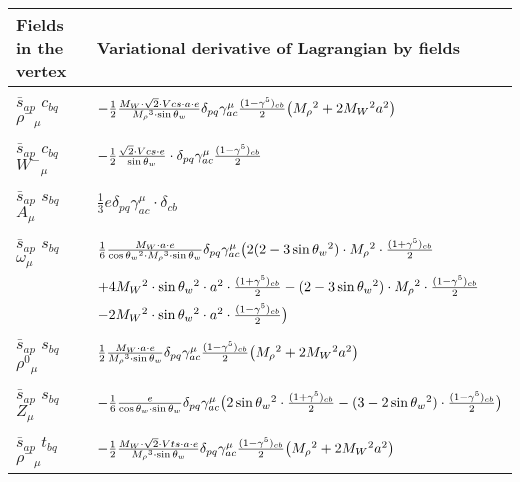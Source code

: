 \begin{center}
\begin{tabular}{|l|l|} \hline
Fields in the vertex & Variational derivative of Lagrangian by fields \\ \hline
$\bar{s}{}_{a p }$ \phantom{-} $c{}_{b q }$ \phantom{-} $\rho^-{}_{\mu }$ \phantom{-}  &
	$-\frac{1}{2}\frac{ M_W \cdot\sqrt{2} \cdot Vcs \cdot a \cdot e}{ M_\rho{}^3  \cdot \sin{\theta}_w}\delta_{p q} \gamma_{a c}^\mu {(1-\gamma^5)_{c b}\over 2} \big( M_\rho{}^2 +2 M_W{}^2  a{}^2 \big)$\\[2mm]
$\bar{s}{}_{a p }$ \phantom{-} $c{}_{b q }$ \phantom{-} $W^-{}_{\mu }$ \phantom{-}  &
	$-\frac{1}{2}\frac{\sqrt{2} \cdot Vcs \cdot e}{ \sin{\theta}_w}\cdot \delta_{p q} \gamma_{a c}^\mu {(1-\gamma^5)_{c b}\over 2} $\\[2mm]
$\bar{s}{}_{a p }$ \phantom{-} $s{}_{b q }$ \phantom{-} ${A}_{\mu }$ \phantom{-}  &
	$\frac{1}{3} e\delta_{p q} \gamma_{a c}^\mu \cdot \delta_{c b} $\\[2mm]
$\bar{s}{}_{a p }$ \phantom{-} $s{}_{b q }$ \phantom{-} $\omega{}_{\mu }$ \phantom{-}  &
	$\frac{1}{6}\frac{ M_W \cdot a \cdot e}{ \cos{\theta}_w{}^2  \cdot M_\rho{}^3  \cdot \sin{\theta}_w}\delta_{p q} \gamma_{a c}^\mu \big(2 (2-3 \sin{\theta}_w {}^2)\cdot  M_\rho{}^2 \cdot {(1+\gamma^5)_{c b}\over 2} $ \\[2mm]
  & $+4 M_W{}^2 \cdot  \sin{\theta}_w{}^2 \cdot  a{}^2 \cdot {(1+\gamma^5)_{c b}\over 2} - (2-3 \sin{\theta}_w {}^2)\cdot  M_\rho{}^2 \cdot {(1-\gamma^5)_{c b}\over 2} $ \\[2mm]
  & $-2 M_W{}^2 \cdot  \sin{\theta}_w{}^2 \cdot  a{}^2 \cdot {(1-\gamma^5)_{c b}\over 2} \big)$\\[2mm]
$\bar{s}{}_{a p }$ \phantom{-} $s{}_{b q }$ \phantom{-} $\rho^0{}_{\mu }$ \phantom{-}  &
	$\frac{1}{2}\frac{ M_W \cdot a \cdot e}{ M_\rho{}^3  \cdot \sin{\theta}_w}\delta_{p q} \gamma_{a c}^\mu {(1-\gamma^5)_{c b}\over 2} \big( M_\rho{}^2 +2 M_W{}^2  a{}^2 \big)$\\[2mm]
$\bar{s}{}_{a p }$ \phantom{-} $s{}_{b q }$ \phantom{-} ${Z}_{\mu }$ \phantom{-}  &
	$-\frac{1}{6}\frac{ e}{ \cos{\theta}_w \cdot \sin{\theta}_w}\delta_{p q} \gamma_{a c}^\mu \big(2 \sin{\theta}_w{}^2 \cdot {(1+\gamma^5)_{c b}\over 2} - (3-2 \sin{\theta}_w {}^2)\cdot {(1-\gamma^5)_{c b}\over 2} \big)$\\[2mm]
$\bar{s}{}_{a p }$ \phantom{-} $t{}_{b q }$ \phantom{-} $\rho^-{}_{\mu }$ \phantom{-}  &
	$-\frac{1}{2}\frac{ M_W \cdot\sqrt{2} \cdot Vts \cdot a \cdot e}{ M_\rho{}^3  \cdot \sin{\theta}_w}\delta_{p q} \gamma_{a c}^\mu {(1-\gamma^5)_{c b}\over 2} \big( M_\rho{}^2 +2 M_W{}^2  a{}^2 \big)$\\[2mm]

\end{tabular}
\end{center}
